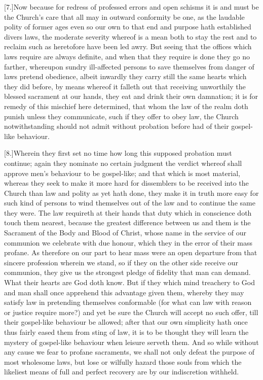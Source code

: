 [7.]Now because for redress of professed errors and open schisms it is and must be the Church’s care that all may in outward conformity be one, as the laudable polity of former ages even so our own to that end and purpose hath established divers laws, the moderate severity whereof is a mean both to stay the rest and to reclaim such as heretofore have been led awry. But seeing that the offices which laws require are  always definite, and when that they require is done they go no farther, whereupon sundry ill-affected persons to save themselves from danger of laws pretend obedience, albeit inwardly they carry still the same hearts which they did before, by means whereof it falleth out that receiving unworthily the blessed sacrament at our hands, they eat and drink their own damnation; it is for remedy of this mischief here determined,  that whom the law of the realm doth punish unless they communicate, such if they offer to obey law,
 the Church notwithstanding should not admit without probation before had of their gospel-like behaviour.

[8.]Wherein they first set no time how long this supposed probation must continue; again they nominate no certain judgment the verdict whereof shall approve men’s behaviour to be gospel-like; and that which is most material, whereas they seek to make it more hard for dissemblers to be received into the Church than law and polity as yet hath done, they make it in truth more easy for such kind of persons to wind themselves out of the law and to continue the same they were. The law requireth at their hands that duty which in conscience doth touch them nearest, because the greatest difference between us and them is the Sacrament of the Body and Blood of Christ, whose name in the service of our communion we celebrate with due honour, which they in the error of their mass profane. As therefore on our part to hear mass were an open departure from that sincere profession wherein we stand, so if they on the other side receive our communion, they give us the strongest pledge of fidelity that man can demand. What their hearts are God doth know. But if they which mind treachery to God and man shall once apprehend this  advantage given them,
 whereby they may satisfy law in pretending themselves conformable (for what can law with reason or justice require more?) and yet be sure the Church will accept no such offer, till their gospel-like behaviour be allowed; after that our own simplicity hath once thus fairly eased them from sting of law, it is to be thought they will learn the mystery of gospel-like behaviour when leisure serveth them. And so while without any cause we fear to profane sacraments, we shall not only defeat the purpose of most wholesome laws, but lose or wilfully hazard those souls from which the likeliest means of full and perfect recovery are by our indiscretion withheld.


